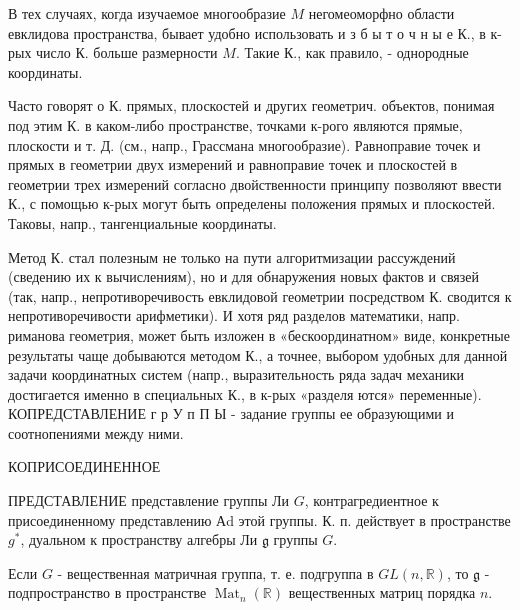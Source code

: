 \documentclass[10pt]{article}
\begin{document}
В тех случаях, когда изучаемое многообразие $M$ негомеоморфно области евклидова пространства, бывает удобно использовать и з б ы т о ч н ы е К., в к-рых число К. больше размерности $M$. Такие К., как правило, - однородные координаты.



Часто говорят о К. прямых, плоскостей и других геометрич. объектов, понимая под этим К. в каком-либо пространстве, точками к-рого являются прямые, плоскости и т. Д. (см., напр., Грассмана многообразие). Равноправие точек и прямых в геометрии двух измерений и равноправие точек и плоскостей в геометрии трех измерений согласно двойственности принципу позволяют ввести К., с помощью к-рых могут быть определены положения прямых и плоскостей. Таковы, напр., тангенциальные координаты.



Метод К. стал полезным не только на пути алгоритмизации рассуждений (сведению их к вычислениям), но и для обнаружения новых фактов и связей (так, напр., непротиворечивость евклидовой геометрии посредством К. сводится к непротиворечивости арифметики). И хотя ряд разделов математики, напр. риманова геометрия, может быть изложен в «бескоординатном» виде, конкретные результаты чаще добываются методом К., а точнее, выбором удобных для данной задачи координатных систем (напр., выразительность ряда задач механики достигается именно в специальных К., в к-рых «разделя ются» переменные). КОПРЕДСТАВЛЕНИЕ г р У п П Ы - задание группы ее образующими и соотнопениями между ними.



КОПРИСОЕДИНЕННОЕ



ПРЕДСТАВЛЕНИЕ представление группы Ли $G$, контрагредиентное к присоединенному представлению Аd этой группы. К. п. действует в пространстве $g^{*}$, дуальном к пространству алгебры Ли $\mathfrak{g}$ группы $G$.



Если $G$ - вещественная матричная группа, т. е. подгруппа в $G L(n, \mathbb{R})$, то $\mathfrak{g}$ - подпространство в пространстве $\operatorname{Mat}_{n}(\mathbb{R})$ вещественных матриц порядка $n$.
\end{document}
